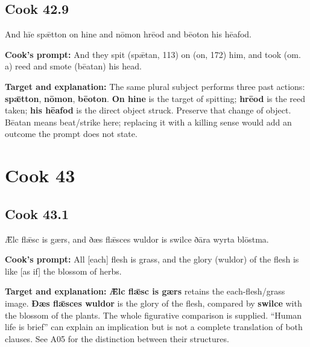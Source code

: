 \par\begin{minipage}{\linewidth}\raggedright
\subsection*{Cook 42.9}

And hīe spǣtton on hine and nōmon hrēod and bēoton his hēafod.

\textbf{Cook's prompt:} And they spit (spǣtan, 113) on (on, 172) him, and took (om. a) reed and smote (bēatan) his head.

\textbf{Target and explanation:} The same plural subject performs three past actions: \textbf{spǣtton}, \textbf{nōmon}, \textbf{bēoton}. \textbf{On hine} is the target of spitting; \textbf{hrēod} is the reed taken; \textbf{his hēafod} is the direct object struck. Preserve that change of object. Bēatan means beat/\allowbreak{}strike here; replacing it with a killing sense would add an outcome the prompt does not state.

\end{minipage}\par\addvspace{4pt}

\clearpage
\section*{Cook 43}

\par\begin{minipage}{\linewidth}\raggedright
\subsection*{Cook 43.1}

Ǣlc flǣsc is gærs, and ðæs flǣsces wuldor is swilce ðāra wyrta blōstma.

\textbf{Cook's prompt:} All [each] flesh is grass, and the glory (wuldor) of the flesh is like [as if] the blossom of herbs.

\textbf{Target and explanation:} \textbf{Ǣlc flǣsc is gærs} retains the each-flesh/\allowbreak{}grass image. \textbf{Ðæs flǣsces wuldor} is the glory of the flesh, compared by \textbf{swilce} with the blossom of the plants. The whole figurative comparison is supplied. “Human life is brief” can explain an implication but is not a complete translation of both clauses. See A05 for the distinction between their structures.

\end{minipage}\par\addvspace{4pt}

